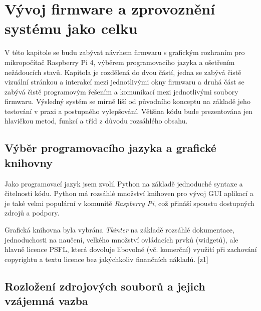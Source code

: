 %
%


\chapter{Vývoj firmware a zprovoznění systému jako celku}

V této kapitole se budu zabývat návrhem firmwaru s grafickým rozhraním pro mikropočítač Raspberry Pi 4, výběrem programovacího jazyka a ošetřením nežádoucích
stavů. Kapitola je rozdělená do dvou částí, jedna se zabývá čistě vizuální stránkou a interakcí mezi jednotlivými okny firmwaru a druhá část se zabývá čistě programovým řešením a komunikací mezi jednotlivými soubory firmwaru. Výsledný systém se mírně liší od původního konceptu na základě jeho testování v praxi a postupného vylepšování.
Většina kódu bude prezentována jen hlavičkou metod, funkcí a tříd z důvodu rozsáhlého obsahu.

\section{Výběr programovacího jazyka a grafické knihovny}
Jako programovací jazyk jsem zvolil Python na základě jednoduché syntaxe a čitelnosti kódu. Python má rozsáhlé množství knihoven pro vývoj GUI aplikací a je také velmi populární v komunitě \textit{Raspberry Pi}, což přináší spoustu dostupných zdrojů a podpory.

Grafická knihovna byla vybrána \textit{Tkinter} na základě rozsáhlé dokumentace, jednoduchosti na naučení, velkého množství ovládacích prvků (widgetů), ale hlavně licence PSFL, která dovoluje libovolné (vč. komerční) využití při zachování copyrightu a textu licence bez jakýchkoliv finančních nákladů. [z1]

\section{Rozložení zdrojových souborů a jejich vzájemná vazba}

